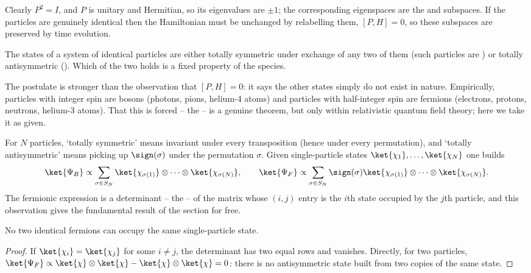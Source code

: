 Clearly $P^2 = I$, and $P$ is unitary and Hermitian, so its eigenvalues are $\pm1$; the corresponding eigenspaces are the  and  subspaces. If the particles are genuinely identical then the Hamiltonian must be unchanged by relabelling them, $[P, H] = 0$, so these subspaces are preserved by time evolution.

\begin{axiom}
    The states of a system of identical particles are either totally symmetric under exchange of any two of them (such particles are ) or totally antisymmetric (). Which of the two holds is a fixed property of the species.
\end{axiom}

The postulate is stronger than the observation that $[P,H] = 0$: it says the other states simply do not exist in nature. Empirically, particles with integer spin are bosons (photons, pions, helium-4 atoms) and particles with half-integer spin are fermions (electrons, protons, neutrons, helium-3 atoms). That this is forced -- the  -- is a genuine theorem, but only within relativistic quantum field theory; here we take it as given.

For $N$ particles, `totally symmetric' means invariant under every transposition (hence under every permutation), and `totally antisymmetric' means picking up $\sign(\sigma)$ under the permutation $\sigma$. Given single-particle states $\ket{\chi_1},\dots,\ket{\chi_N}$ one builds
$$
\ket{\Psi_B} \propto \sum_{\sigma \in S_N}\ket{\chi_{\sigma(1)}}\otimes\cdots\otimes\ket{\chi_{\sigma(N)}}, \qquad
\ket{\Psi_F} \propto \sum_{\sigma\in S_N}\sign(\sigma)\ket{\chi_{\sigma(1)}}\otimes\cdots\otimes\ket{\chi_{\sigma(N)}}.
$$
The fermionic expression is a determinant -- the  -- of the matrix whose $(i,j)$ entry is the $i$th state occupied by the $j$th particle, and this observation gives the fundamental result of the section for free.

\begin{theorem}
    No two identical fermions can occupy the same single-particle state.
\end{theorem}
\begin{proof}
    If $\ket{\chi_i} = \ket{\chi_j}$ for some $i\neq j$, the determinant has two equal rows and vanishes. Directly, for two particles, $\ket{\Psi_F} \propto \ket{\chi}\otimes\ket{\chi} - \ket{\chi}\otimes\ket{\chi} = 0$: there is no antisymmetric state built from two copies of the same state.
\end{proof}

